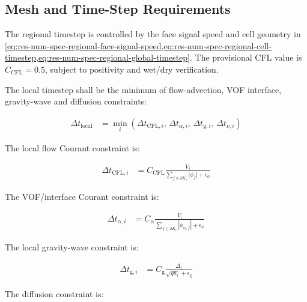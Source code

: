 
\subsection{Mesh and Time-Step Requirements}
\label{sec:res-num-tim-mesh-time-step-requirements}

The regional timestep is controlled by the face signal speed and cell
geometry in
\cref{eq:res-num-spec-regional-face-signal-speed,eq:res-num-spec-regional-cell-timestep,eq:res-num-spec-regional-global-timestep}.
The provisional CFL value is $C_{\mathrm{CFL}}=0.5$, subject to
positivity and wet/dry verification.

The local timestep shall be the minimum of flow-advection, VOF
interface, gravity-wave and diffusion constraints:

\begin{align}
  \Delta t_{\mathrm{local}}
  &=
  \min_i
  \left(
    \Delta t_{\mathrm{CFL},i},\,
    \Delta t_{\alpha,i},\,
    \Delta t_{\mathrm{g},i},\,
    \Delta t_{\nu,i}
  \right)
  \label{eq:res-num-tim-local-timestep-minimum}
\end{align}

The local flow Courant constraint is:

\begin{align}
  \Delta t_{\mathrm{CFL},i}
  &=
  C_{\mathrm{CFL}}
  \frac{
    V_i
  }{
    \sum_{f\in\partial K_i}
    \left|
      \phi_f
    \right|
    +
    \epsilon_{\phi}
  }
  \label{eq:res-num-tim-local-flow-cfl}
\end{align}

The VOF/interface Courant constraint is:

\begin{align}
  \Delta t_{\alpha,i}
  &=
  C_{\alpha}
  \frac{
    V_i
  }{
    \sum_{f\in\partial K_i}
    \left|
      \phi_{\alpha,f}
    \right|
    +
    \epsilon_{\phi}
  }
  \label{eq:res-num-tim-local-interface-cfl}
\end{align}

The local gravity-wave constraint is:

\begin{align}
  \Delta t_{\mathrm{g},i}
  &=
  C_{\mathrm{g}}
  \frac{
    \Delta_i
  }{
    \sqrt{
      g h_i
    }
    +
    \epsilon_{\mathrm{g}}
  }
  \label{eq:res-num-tim-local-gravity-wave-cfl}
\end{align}

The diffusion constraint is:

